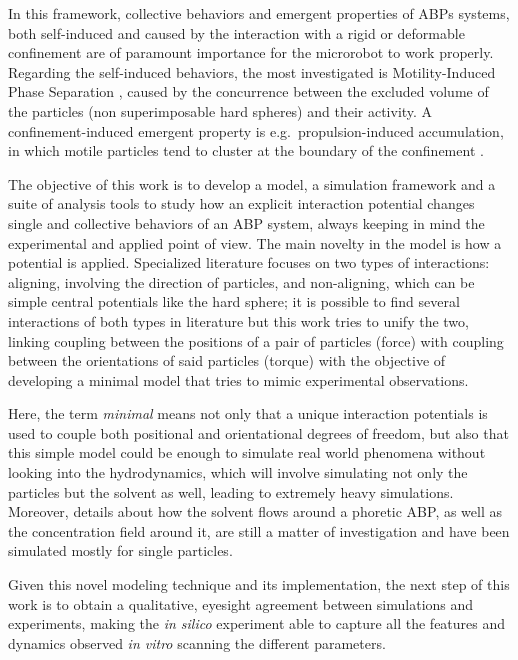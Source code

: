 \documentclass[../../master_thesis_np.tex]{subfiles}
\begin{document}
	In this framework, collective behaviors and emergent properties of ABPs systems, both self-induced and caused by the interaction with a rigid or deformable confinement are of paramount importance for the microrobot to work properly. Regarding the self-induced behaviors, the most investigated is Motility-Induced Phase Separation \parencite{cates_motility-induced_2015}, caused by the concurrence between the excluded volume of the particles (non superimposable hard spheres) and their activity. A confinement-induced emergent property is e.g.\ propulsion-induced accumulation, in which motile particles tend to cluster at the boundary of the confinement \parencite{marconi_towards_2015}.
	
	The objective of this work is to develop a model, a simulation framework and a suite of analysis tools to study how an explicit interaction potential changes single and collective behaviors of an ABP system, always keeping in mind the experimental and applied point of view. The main novelty in the model is how a potential is applied. Specialized literature focuses on two types of interactions: aligning, involving the direction of particles, and non-aligning, which can be simple central potentials like the hard sphere; it is possible to find several interactions of both types in literature but this work tries to unify the two, linking coupling between the positions of a pair of particles (force) with coupling between the orientations of said particles (torque) with the objective of developing a minimal model that tries to mimic experimental observations.
	
	Here, the term \emph{minimal} means not only that a unique interaction potentials is used to couple both positional and orientational degrees of freedom, but also that this simple model could be enough to simulate real world phenomena without looking into the hydrodynamics, which will involve simulating not only the particles but the solvent as well, leading to extremely heavy simulations. Moreover, details about how the solvent flows around a phoretic ABP, as well as the concentration field around it, are still a matter of investigation and have been simulated mostly for single particles. 
	
	Given this novel modeling technique and its implementation, the next step of this work is to obtain a qualitative, eyesight agreement between simulations and experiments, making the \emph{in silico} experiment able to capture all the features and dynamics observed \emph{in vitro} scanning the different parameters.
	
\end{document}
